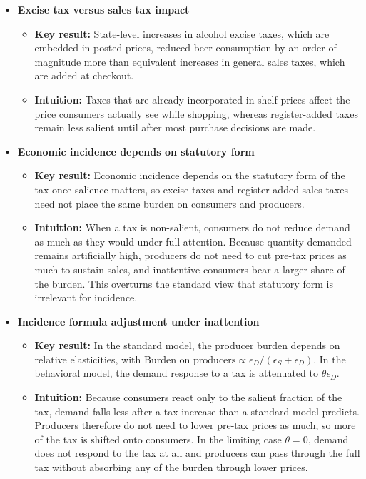 \documentclass[11pt]{article}
\begin{document}
\begin{itemize}
    \item \textbf{Excise tax versus sales tax impact}
    \begin{itemize}
        \item \textbf{Key result:} State-level increases in alcohol excise
        taxes, which are embedded in posted prices, reduced beer consumption by
        an order of magnitude more than equivalent increases in general sales
        taxes, which are added at checkout.
        \item \textbf{Intuition:} Taxes that are already incorporated in shelf
        prices affect the price consumers actually see while shopping, whereas
        register-added taxes remain less salient until after most purchase
        decisions are made.
    \end{itemize}

    \item \textbf{Economic incidence depends on statutory form}
    \begin{itemize}
        \item \textbf{Key result:} Economic incidence depends on the statutory
        form of the tax once salience matters, so excise taxes and register-added
        sales taxes need not place the same burden on consumers and producers.
        \item \textbf{Intuition:} When a tax is non-salient, consumers do not
        reduce demand as much as they would under full attention.  Because
        quantity demanded remains artificially high, producers do not need to
        cut pre-tax prices as much to sustain sales, and inattentive consumers
        bear a larger share of the burden.  This overturns the standard view
        that statutory form is irrelevant for incidence.
    \end{itemize}

    \item \textbf{Incidence formula adjustment under inattention}
    \begin{itemize}
        \item \textbf{Key result:} In the standard model, the producer burden
        depends on relative elasticities, with
        $\text{Burden on producers} \propto \epsilon_D/(\epsilon_S+\epsilon_D)$.
        In the behavioral model, the demand response to a tax is attenuated to
        $\theta \epsilon_D$.
        \item \textbf{Intuition:} Because consumers react only to the salient
        fraction of the tax, demand falls less after a tax increase than a
        standard model predicts.  Producers therefore do not need to lower
        pre-tax prices as much, so more of the tax is shifted onto consumers.
        In the limiting case $\theta=0$, demand does not respond to the tax at
        all and producers can pass through the full tax without absorbing any
        of the burden through lower prices.
    \end{itemize}


\end{itemize}
\end{document}
